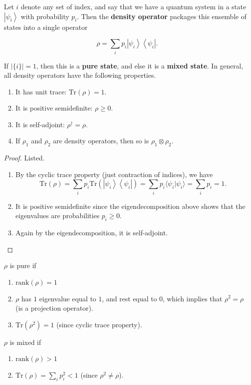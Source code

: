 \documentclass{article}
\newcommand{\ket}[1]{\ensuremath{\left|#1\right\rangle}}
\newcommand{\bra}[1]{\ensuremath{\left\langle#1\right|}}
\begin{document}
    \begin{definition}
      Let $i$ denote any set of index, and say that we have a quantum system in a state $\ket{\psi_i}$ with probability $p_i$. Then the \textbf{density operator} packages this ensemble of states into a single operator

        \[\rho = \sum_i p_i \ket{\psi_i} \bra{\psi_i}.\]

      If $|\{i\}| = 1$, then this is a \textbf{pure state}, and else it is a \textbf{mixed state}. In general, all density operators have the following properties. 
      \begin{enumerate}
        \item It has unit trace: $\text{Tr}(\rho) = 1$.
        \item It is positive semidefinite: $\rho \geq 0$.
        \item It is self-adjoint: $\rho^\dagger = \rho$.
        \item If $\rho_1$ and $\rho_2$ are density operators, then so is $\rho_1 \otimes \rho_2$. 
      \end{enumerate}
    \end{definition}
    \begin{proof} 
      Listed. 
      \begin{enumerate} 
        \item By the cyclic trace property (just contraction of indices), we have 
          \begin{equation} 
            \text{Tr}(\rho) = \sum_i p_i \text{Tr}(\ket{\psi_i} \bra{\psi_i}) = \sum_i p_i \langle \psi_i | \psi_i \rangle = \sum_i p_i = 1.
          \end{equation}
        \item It is positive semidefinite since the eigendecomposition above shows that the eigenvalues are probabilities $p_i \geq 0$. 
        \item Again by the eigendecomposition, it is self-adjoint. 
      \end{enumerate}
    \end{proof}

    \begin{theorem}
      $\rho$ is pure if 
      \begin{enumerate} 
        \item $\mathrm{rank}(\rho) = 1$ 
        \item $\rho$ has $1$ eigenvalue equal to $1$, and rest equal to $0$, which implies that $\rho^2 = \rho$ (is a projection operator).
        \item $\mathrm{Tr}(\rho^2) = 1$ (since cyclic trace property). 
      \end{enumerate}

      $\rho$ is mixed if 
      \begin{enumerate} 
        \item $\mathrm{rank}(\rho) > 1$
        \item $\mathrm{Tr}(\rho) = \sum_i p_i^2 < 1$ (since $\rho^2 \neq \rho$).
      \end{enumerate}
    \end{theorem}
\end{document}
